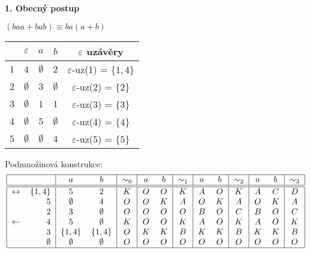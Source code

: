 \textbf{1. Obecný postup}

\begin{multicols}{2}

    $(baa + bab) \equiv ba(a+b)$


\columnbreak

    \begin{tabular}{|r|c c c|c|}
        \hline
        & $\varepsilon$ & $a$ & $b$ & $\varepsilon$ uzávěry\\
        \hline
        \hline
        $1$ & $4$ & $\emptyset$ & $2$         & $\varepsilon$-uz(1) = $\{1,4\}$\\
        $2$ & $\emptyset$ & $3$ & $\emptyset$ & $\varepsilon$-uz(2) = $\{2\}$\\
        $3$ & $\emptyset$ & $1$ & $1$         & $\varepsilon$-uz(3) = $\{3\}$\\
        $4$ & $\emptyset$ & $5$ & $\emptyset$ & $\varepsilon$-uz(4) = $\{4\}$\\
        $5$ & $\emptyset$ & $\emptyset$ & $4$ & $\varepsilon$-uz(5) = $\{5\}$\\
        \hline
    \end{tabular}
\end{multicols}
\newpage
Podmnožinová konstrukce:
\[
\begin{tabular}{|r r|c c|c|c c|c|c c|c|c c|c|}
    \hline
    & & $a$ & $b$ & $\sim_0$ & $a$ & $b$ & $\sim_1$ & $a$ & $b$ & $\sim_2$ & $a$ & $b$ & $\sim_3$\\
    \hline
    \hline
    $\leftrightarrow$& $\{1,4\}$ &$5$         &$2$         &$K$ &$O$ &$O$ &$K$ &$A$ &$O$ &$K$ &$A$ &$C$ &$D$\\
    $$&             $5$          &$\emptyset$ &$4$         &$O$ &$O$ &$K$ &$A$ &$O$ &$K$ &$A$ &$O$ &$K$ &$A$\\
    $$&             $2$          &$3$         &$\emptyset$ &$O$ &$O$ &$O$ &$O$ &$B$ &$O$ &$C$ &$B$ &$O$ &$C$\\
    $\leftarrow $&  $4$          &$5$         &$\emptyset$ &$K$ &$O$ &$O$ &$K$ &$A$ &$O$ &$K$ &$A$ &$O$ &$K$\\
    $$&             $3$          &$\{1,4\}$   &$\{1,4\}$   &$O$ &$K$ &$K$ &$B$ &$K$ &$K$ &$B$ &$K$ &$K$ &$B$\\
    $$&             $\emptyset$  &$\emptyset$ &$\emptyset$ &$O$ &$O$ &$O$ &$O$ &$O$ &$O$ &$O$ &$O$ &$O$ &$O$\\
    \hline
\end{tabular}
\]
